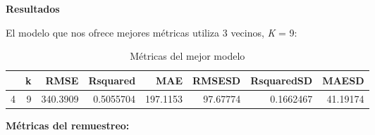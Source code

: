\documentclass[
]{article}
\begin{document}
\textbf{Resultados}

El modelo que nos ofrece mejores métricas utiliza 3 vecinos, \emph{K} =
9:

\begin{table}[H]

\caption{\label{tab:unnamed-chunk-42}Métricas del mejor modelo}
\centering
\begin{tabular}[t]{lrrrrrrr}
\toprule
  & k & RMSE & Rsquared & MAE & RMSESD & RsquaredSD & MAESD\\
\midrule
4 & 9 & 340.3909 & 0.5055704 & 197.1153 & 97.67774 & 0.1662467 & 41.19174\\
\bottomrule
\end{tabular}
\end{table}

\textbf{Métricas del remuestreo:}
\end{document}
